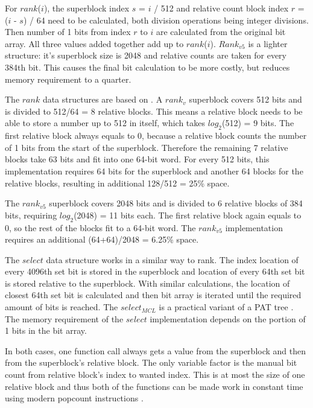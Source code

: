 For $rank$($i$), the superblock index $s$ = $i$ / 512 and relative count block index $r$ = ($i$ - $s$) / 64 need to be calculated, both division operations being integer divisions. Then number of 1 bits 
from index $r$ to $i$ are calculated from the original bit array. All three values added 
together add up to $rank$($i$). $Rank_{v5}$ is a lighter structure: it's superblock size is 2048 and relative counts are taken for every 384th bit. This causes the final bit calculation to be more costly, 
but reduces memory requirement to a quarter.

The $rank$ data structures are based on \citep{Vig08}. A $rank_v$ superblock covers 512 bits and is divided to 512/64 = 8 relative blocks. This means a relative block needs to be able to store a number up to 512 in itself, which takes $log_2$(512) = 9 bits. 
The first relative block always equals to 0, because a relative block counts the number of 1 bits from the start of the superblock. Therefore the remaining 7 relative blocks take 63 bits and fit into one 
64-bit word. For every 512 bits, this implementation requires 64 bits for the superblock and another 64 blocks for the relative blocks, resulting in additional 128/512 = 25\% space.

The $rank_{v5}$ superblock covers 2048 bits and is divided to 6 relative blocks of 384 bits, requiring $log_2$(2048) = 11 bits each. The first relative block again equals to 0, so the rest 
of the blocks fit to a 64-bit word. The $rank_{v5}$ implementation requires an additional (64+64)/2048 = 6.25\% space.

The $select$ data structure works in a similar way to rank. The index location of every 4096th set bit is stored in the superblock and location of every 64th set bit is stored 
relative to the superblock. With similar calculations, the location of closest 64th set bit is calculated and then bit array is iterated until the required amount of bits is reached. The $select_{MCL}$
 is a practical variant of a PAT tree \citep{Cla97}. The memory requirement of the $select$ implementation depends on the portion of 1 bits in the bit array.

In both cases, one function call always gets a value from the superblock and then from the superblock's relative block. The only variable factor is the manual bit count from relative
block's index to wanted index. This is at most the size of one relative block and thus both of the functions can be made work in constant time using modern popcount instructions \citep{Gon05}.


